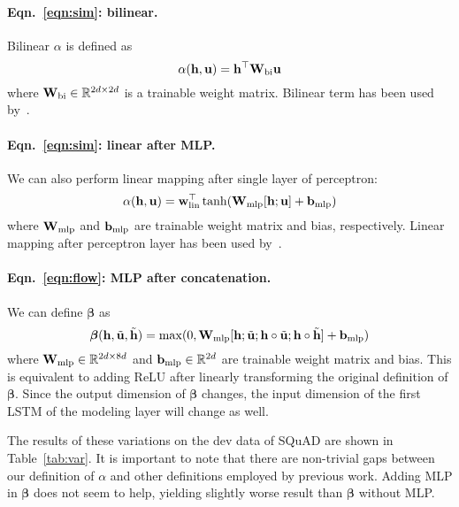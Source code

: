 \documentclass{article} \usepackage{iclr2017_conference,times}
\begin{document}
\paragraph{Eqn.~\ref{eqn:sim}: bilinear.} 
Bilinear $\alpha$ is defined as
\begin{equation}
\alpha({\bf h}, {\bf u}) = {\bf h}^\top {\bf W}_\textup{bi} {\bf u}
\end{equation}
where ${\bf W}_\textup{bi} \in \mathbb{R}^{2d \times 2d}$ is a trainable weight matrix. 
Bilinear term has been used by~\cite{thorough}.

\paragraph{Eqn.~\ref{eqn:sim}: linear after MLP.} 
We can also perform linear mapping after single layer of perceptron:
\begin{equation}
\alpha({\bf h}, {\bf u}) = {\bf w}_\textup{lin}^\top \tanh({\bf W}_\textup{mlp} [{\bf h}; {\bf u}] + {\bf b}_\textup{mlp})
\end{equation}
where ${\bf W}_\textup{mlp}$ and ${\bf b}_\textup{mlp}$ are trainable weight matrix and bias, respectively.
Linear mapping after perceptron layer has been used by~\cite{Hermann2015TeachingMT}.

\paragraph{Eqn.~\ref{eqn:flow}: MLP after concatenation.}
We can define ${\bm \beta}$ as
\begin{equation}
{\bm \beta}({\bf h}, \tilde{\bf u}, \tilde{\bf h}) = \max(0, {\bf W}_\textup{mlp} [{\bf h}; \tilde{\bf u}; {\bf h} \circ \tilde{\bf u}; {\bf h} \circ \tilde{\bf h}] + {\bf b}_\textup{mlp})
\end{equation}
where ${\bf W}_\textup{mlp} \in \mathbb{R}^{2d \times 8d}$ and ${\bf b}_\textup{mlp} \in \mathbb{R}^{2d}$ are trainable weight matrix and bias.
This is equivalent to adding ReLU after linearly transforming the original definition of ${\bm \beta}$.
Since the output dimension of ${\bm \beta}$ changes, the input dimension of the first LSTM of the modeling layer will change as well.


The results of these variations on the dev data of SQuAD are shown in Table~\ref{tab:var}.
It is important to note that there are non-trivial gaps between our definition of $\alpha$ and other definitions employed by previous work.
Adding MLP in ${\bm \beta}$ does not seem to help, yielding slightly worse result than ${\bm \beta}$ without MLP. 
\end{document}
